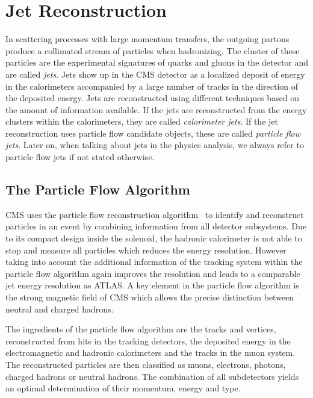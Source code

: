 
\chapter{Jet Reconstruction}
\label{chap:jet_reconstruction}

In scattering processes with large momentum transfers, the outgoing partons
produce a collimated stream of particles when hadronizing. The cluster of these
particles are the experimental signatures of quarks and gluons in the detector
and are called \emph{jets}. Jets show up in the CMS detector as a localized
deposit of energy in the calorimeters accompanied by a large number of tracks in
the direction of the deposited energy. Jets are reconstructed using different
techniques based on the amount of information available. If the jets are
reconstructed from the energy clusters within the calorimeters, they are called
\emph{calorimeter jets}. If the jet reconstruction uses particle flow candidate
objects, these are called \emph{particle flow jets}. Later on, when talking
about jets in the physics analysis, we always refer to particle flow jets if not
stated otherwise.

\section{The Particle Flow Algorithm}
\label{sec:particle_flow_algorithm}

CMS uses the particle flow reconstruction
algorithm~\cite{CMS-PAS-PFT-09-001,CMS-PAS-PFT-10-001} to identify and
reconstruct particles in an event by combining information from all detector
subsystems. Due to its compact design inside the solenoid, the hadronic
calorimeter is not able to stop and measure all particles which reduces the
energy resolution. However taking into account the additional information of the
tracking system within the particle flow algorithm again improves the resolution
and leads to a comparable jet energy resolution as ATLAS. A key element in the
particle flow algorithm is the strong magnetic field of CMS which allows the
precise distinction between neutral and charged hadrons. 

The ingredients of the particle flow algorithm are the
tracks and vertices, reconstructed from hits in the tracking detectors, the
deposited energy in the electromagnetic and hadronic calorimeters and the tracks
in the muon system. The reconstructed particles are then classified as muons,
electrons, photons, charged hadrons or neutral hadrons. The combination of all
subdetectors yields an optimal determination of their momentum, energy and type.

